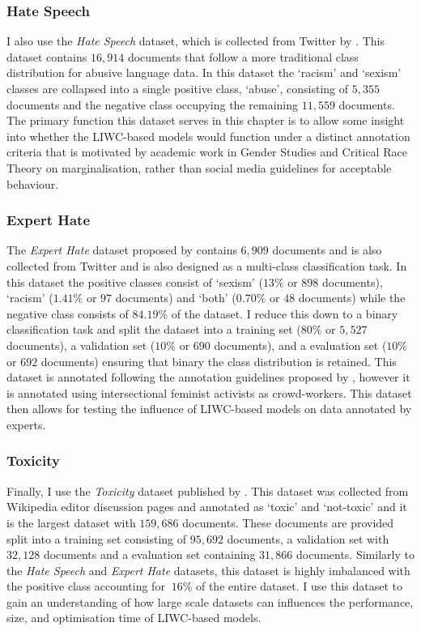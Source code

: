 \subsubsection{Hate Speech}
I also use the \textit{Hate Speech} dataset, which is collected from Twitter by \citet{Waseem-Hovy:2016}.
This dataset contains $16,914$ documents that follow a more traditional class distribution for abusive language data.
In this dataset the  `racism' and `sexism' classes are collapsed into a single positive class, `abuse', consisting of $5,355$ documents and the negative class occupying the remaining $11,559$ documents.
The primary function this dataset serves in this chapter is to allow some insight into whether the LIWC-based models would function under a distinct annotation criteria that is motivated by academic work in Gender Studies and Critical Race Theory on marginalisation, rather than social media guidelines for acceptable behaviour.

\subsubsection{Expert Hate}
The \textit{Expert Hate} dataset proposed by \citet{Waseem:2016} contains $6,909$ documents and is also collected from Twitter and is also designed as a multi-class classification task.
In this dataset the positive classes consist of `sexism' ($13\%$ or $898$ documents), `racism' ($1.41\%$ or $97$ documents) and `both' ($0.70\%$ or $48$ documents) while the negative class consists of $84.19\%$ of the dataset.
I reduce this down to a binary classification task and split the dataset into a training set ($80\%$ or $5,527$ documents), a validation set ($10\%$ or $690$ documents), and a evaluation set ($10\%$ or $692$ documents) ensuring that binary the class distribution is retained.
This dataset is annotated following the annotation guidelines proposed by \citet{Waseem-Hovy:2016}, however it is annotated using intersectional feminist activists as crowd-workers.
This dataset then allows for testing the influence of LIWC-based models on data annotated by experts.

\subsubsection{Toxicity}
Finally, I use the \textit{Toxicity} dataset published by \citet{Wulczyn:2017}.
This dataset was collected from Wikipedia editor discussion pages and annotated as `toxic' and `not-toxic' and it is the largest dataset with $159,686$ documents.
These documents are provided split into a training set consisting of $95,692$ documents, a validation set with $32,128$ documents and a evaluation set containing $31,866$ documents.
Similarly to the \textit{Hate Speech} and \textit{Expert Hate} datasets, this dataset is highly imbalanced with the positive class accounting for $~16\%$ of the entire dataset.
I use this dataset to gain an understanding of how large scale datasets can influences the performance, size, and optimisation time of LIWC-based models.

